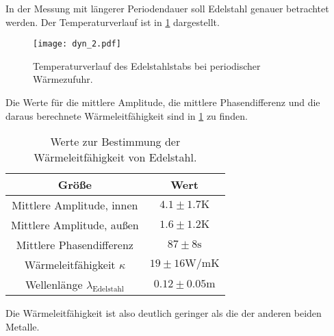   In der Messung mit längerer Periodendauer soll Edelstahl genauer betrachtet werden. Der Temperaturverlauf ist in \ref{fig:dynedel} dargestellt.

  \begin{figure}
    \centering
    \texttt{[image: dyn\_2.pdf]}
    \caption{Temperaturverlauf des Edelstahlstabs bei periodischer Wärmezufuhr.}
    \label{fig:dynedel}
  \end{figure}

  \FloatBarrier

  \noindent Die Werte für die mittlere Amplitude, die mittlere Phasendifferenz und die daraus berechnete Wärmeleitfähigkeit sind in \ref{tab:gehsterben} zu finden.

  \begin{table}
    \centering
    \caption{Werte zur Bestimmung der Wärmeleitfähigkeit von Edelstahl.}
    \label{tab:gehsterben}
    \begin{tabular}{c c }
      \toprule
      Größe & Wert \\
      \midrule %
      Mittlere Amplitude, innen & $4.1 \pm 1.7 \si{\kelvin}$\\
      Mittlere Amplitude, außen & $1.6 \pm 1.2 \si{\kelvin}$\\
      Mittlere Phasendifferenz & $ 87 \pm 8\si{\s}$ \\%
      Wärmeleitfähigkeit $\kappa$ & $19 \pm 16 \si{\watt\per\m\kelvin}$ \\ %
      Wellenlänge $\lambda_{\text{Edelstahl}}$ & $0.12 \pm 0.05 \si{\m}$\\
      \bottomrule
    \end{tabular}
  \end{table}

  \FloatBarrier
  \noindent Die Wärmeleitfähigkeit ist also deutlich geringer als die der anderen beiden Metalle.
